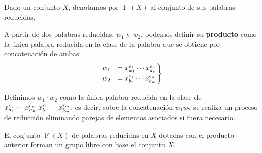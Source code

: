 Dado un conjunto $X$, denotamos por $\operatorname{F}(X)$ al conjunto de sus palabras reducidas.


A partir de dos palabras reducidas, $w_1$ y $w_2$, podemos definir su \textbf{producto} como la única palabra reducida en la clase de la palabra que se obtiene por concatenación de ambas: \label{producto}
\begin{align*}
\begin{rcases}
w_1 &= x_{a_1}^{\epsilon_1} \cdots x_{a_n}^{\epsilon_n}  \\
w_2 &= x_{b_1}^{\epsilon_1} \cdots x_{b_m}^{\epsilon_n}
\end{rcases}
\end{align*}

Definimos $w_1\cdot w_2$ como la única palabra reducida en la clase de $x_{a_1}^{\epsilon_1} \cdots x_{a_n}^{\epsilon_n} \hspace{0.1cm} x_{b_1}^{\epsilon_1} \cdots x_{b_m}^{\epsilon_m}$; es decir, sobre la concatenación $w_1w_2$ se realiza un proceso de reducción eliminando parejas de elementos asociados si fuera necesario. 









\begin{theorem}[Existencia]
El conjunto $\operatorname{F}(X)$ de palabras reducidas en $X$ dotadas con el producto anterior forman un grupo libre con base el conjunto $X$.
\end{theorem}

